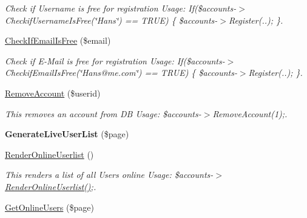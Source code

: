 \begin{DoxyCompactItemize}
\begin{DoxyCompactList}\small\item\em Check if Username is free for registration Usage\-: If(\$accounts-\/$>$Checkif\-Username\-Is\-Free(\char`\"{}\-Hans\char`\"{}) == T\-R\-U\-E) \{ \$accounts-\/$>$Register(..); \}. \end{DoxyCompactList}\item 
\hypertarget{class_u_e4___account_handler_a64d6faff7acdf23772820fb5a54b53b1}{\hyperlink{class_u_e4___account_handler_a64d6faff7acdf23772820fb5a54b53b1}{Check\-If\-Email\-Is\-Free} (\$email)}\label{class_u_e4___account_handler_a64d6faff7acdf23772820fb5a54b53b1}

\begin{DoxyCompactList}\small\item\em Check if E-\/\-Mail is free for registration Usage\-: If(\$accounts-\/$>$Checkif\-Email\-Is\-Free(\char`\"{}\-Hans@me.\-com\char`\"{}) == T\-R\-U\-E) \{ \$accounts-\/$>$Register(..); \}. \end{DoxyCompactList}\item 
\hypertarget{class_u_e4___account_handler_a24079ae9534790d1f6b99cd1ea184a63}{\hyperlink{class_u_e4___account_handler_a24079ae9534790d1f6b99cd1ea184a63}{Remove\-Account} (\$userid)}\label{class_u_e4___account_handler_a24079ae9534790d1f6b99cd1ea184a63}

\begin{DoxyCompactList}\small\item\em This removes an account from D\-B Usage\-: \$accounts-\/$>$Remove\-Account(1);. \end{DoxyCompactList}\item 
\hypertarget{class_u_e4___account_handler_aabb96f46f584fad72399ae15c4f9f1c5}{{\bfseries Generate\-Live\-User\-List} (\$page)}\label{class_u_e4___account_handler_aabb96f46f584fad72399ae15c4f9f1c5}

\item 
\hypertarget{class_u_e4___account_handler_afe1bf6ac047359c94656c7e1045c856d}{\hyperlink{class_u_e4___account_handler_afe1bf6ac047359c94656c7e1045c856d}{Render\-Online\-Userlist} ()}\label{class_u_e4___account_handler_afe1bf6ac047359c94656c7e1045c856d}

\begin{DoxyCompactList}\small\item\em This renders a list of all Users online Usage\-: \$accounts-\/$>$\hyperlink{class_u_e4___account_handler_afe1bf6ac047359c94656c7e1045c856d}{Render\-Online\-Userlist()};. \end{DoxyCompactList}\item 
\hypertarget{class_u_e4___account_handler_acd1ece5e2413a2422d27e6ce768f767e}{\hyperlink{class_u_e4___account_handler_acd1ece5e2413a2422d27e6ce768f767e}{Get\-Online\-Users} (\$page)}\label{class_u_e4___account_handler_acd1ece5e2413a2422d27e6ce768f767e}


\end{DoxyCompactItemize}
